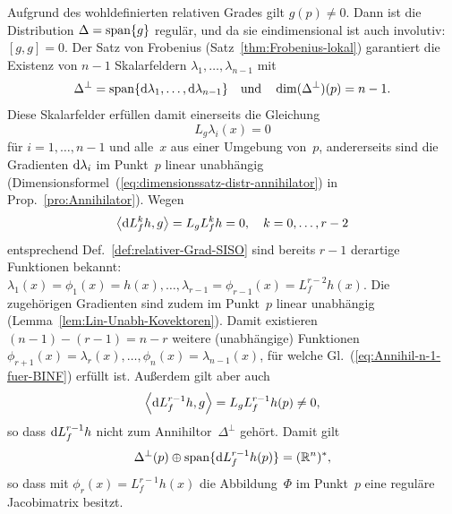 \begin{svmultproof2}
Aufgrund des wohldefinierten relativen Grades gilt $g(p)\neq0$. Dann
ist die Distribution $\Delta={\operatorname{span}}\{g\}$ regulär, und da sie eindimensional
ist auch involutiv: $[g,g]=0$. Der Satz von Frobenius (Satz~\ref{thm:Frobenius-lokal})
garantiert die Existenz von $n-1$ Skalarfeldern $\lambda_{1},\ldots,\lambda_{n-1}$
mit 
\begin{equation}
\Delta^{\perp}={\operatorname{span}}\{{\mathrm{d}}\lambda_{1},\ldots,{\mathrm{d}}\lambda_{n-1}\}\quad\text{und}\quad\dim(\Delta^{\perp})(p)=n-1.\label{eq:Annihil-n-1-fuer-BINF}
\end{equation}
Diese Skalarfelder erfüllen damit einerseits die Gleichung
\[
L_{g}\lambda_{i}(x)=0
\]
für $i=1,\ldots,n-1$ und alle~$x$ aus einer Umgebung von~$p$,
andererseits sind die Gradienten ${\mathrm{d}}\lambda_{i}$ im Punkt~$p$ linear
unabhängig (Dimensionsformel~(\ref{eq:dimensionssatz-distr-annihilator})
in Prop.~\ref{pro:Annihilator}). Wegen 
\[
\left\langle {\mathrm{d}} L_{f}^{k}h,g\right\rangle =L_{g}L_{f}^{k}h=0,\quad k=0,\ldots,r-2
\]
entsprechend Def.~\ref{def:relativer-Grad-SISO} sind bereits $r-1$
derartige Funktionen bekannt: $\lambda_{1}(x)=\phi_{1}(x)=h(x),\ldots,\lambda_{r-1}=\phi_{r-1}(x)=L_{f}^{r-2}h(x)$.
Die zugehörigen Gradienten sind zudem im Punkt~$p$ linear unabhängig
(Lemma~\ref{lem:Lin-Unabh-Kovektoren}). Damit existieren $(n-1)-(r-1)=n-r$
weitere (unabhängige) Funktionen $\phi_{r+1}(x)=\lambda_{r}(x),\ldots,\phi_{n}(x)=\lambda_{n-1}(x)$,
für welche Gl.~(\ref{eq:Annihil-n-1-fuer-BINF}) erfüllt ist. Außerdem
gilt aber auch 
\[
\left\langle {\mathrm{d}} L_{f}^{r-1}h,g\right\rangle =L_{g}L_{f}^{r-1}h(p)\neq0,
\]
so dass ${\mathrm{d}} L_{f}^{r-1}h$ nicht zum Annihiltor~$\Delta^{\perp}$
gehört. Damit gilt 
\[
\Delta^{\perp}(p)\oplus{\operatorname{span}}\{{\mathrm{d}} L_{f}^{r-1}h(p)\}=({\mathbb{R}}^{n})^{*},
\]
so dass mit $\phi_{r}(x)=L_{f}^{r-1}h(x)$ die Abbildung~$\Phi$
im Punkt~$p$ eine reguläre Jacobimatrix besitzt.
\end{svmultproof2}


